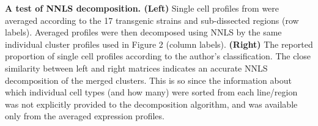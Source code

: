 \textbf{A test of NNLS decomposition. (Left)} Single cell profiles from \cite{Tasic_2016} were averaged according to the 17 transgenic strains and sub-dissected regions (row labels). Averaged profiles were then decomposed using NNLS by the same individual cluster profiles used in Figure 2 (column labels). \textbf{(Right)} The reported proportion of single cell profiles according to the author's classification. The close similarity between left and right matrices indicates an accurate NNLS decomposition of the merged clusters. This is so since the information about which individual cell types (and how many) were sorted from each line/region was not explicitly provided to the decomposition algorithm, and was available only from the averaged expression profiles.